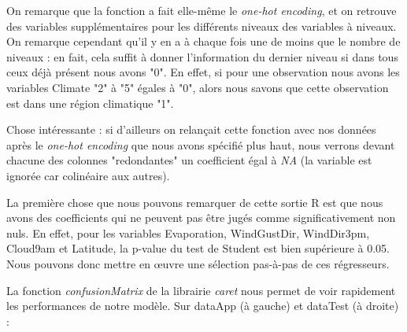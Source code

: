 \documentclass{article}
\begin{document}
On remarque que la fonction a fait elle-même le \emph{one-hot encoding}, et on retrouve des variables supplémentaires pour les différents niveaux des variables à niveaux. On remarque cependant qu'il y en a à chaque fois une de moins que le nombre de niveaux : en fait, cela suffit à donner l'information du dernier niveau si dans tous ceux déjà présent nous avons "0". En effet, si pour une observation nous avons les variables Climate "2" à "5" égales à "0", alors nous savons que cette observation est dans une région climatique "1". 

Chose intéressante : si d'ailleurs on relançait cette fonction avec nos données après le \emph{one-hot encoding} que nous avons spécifié plus haut, nous verrons devant chacune des colonnes "redondantes" un coefficient égal à \emph{NA} (la variable est ignorée car colinéaire aux autres).

La première chose que nous pouvons remarquer de cette sortie R est que nous avons des coefficients qui ne peuvent pas être jugés comme significativement non nuls. En effet, pour les variables Evaporation, WindGustDir, WindDir3pm, Cloud9am et Latitude, la p-value du test de Student est bien supérieure à 0.05. Nous pouvons donc mettre en œuvre une sélection pas-à-pas de ces régresseurs.  

La fonction \emph{confusionMatrix} de la librairie \emph{caret} nous permet de voir rapidement les performances de notre modèle. Sur dataApp (à gauche) et dataTest (à droite) : 
\end{document}

